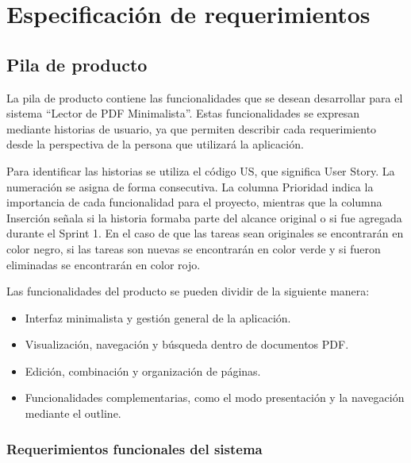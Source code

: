 \chapter{Especificación de requerimientos}
\section{Pila de producto}

La pila de producto contiene las funcionalidades que se desean desarrollar para el sistema “Lector de PDF Minimalista”. Estas funcionalidades se expresan mediante historias de usuario, ya que permiten describir cada requerimiento desde la perspectiva de la persona que utilizará la aplicación.

Para identificar las historias se utiliza el código US, que significa User Story. La numeración se asigna de forma consecutiva. La columna Prioridad indica la importancia de cada funcionalidad para el proyecto, mientras que la columna Inserción señala si la historia formaba parte del alcance original o si fue agregada durante el Sprint 1. En el caso de que las tareas sean originales se encontrarán en color negro, si las tareas son nuevas se encontrarán en color verde y si fueron eliminadas se encontrarán en color rojo.

Las funcionalidades del producto se pueden dividir de la siguiente manera:
\begin{itemize}
    \item Interfaz minimalista y gestión general de la aplicación.
    \item Visualización, navegación y búsqueda dentro de documentos PDF.
    \item Edición, combinación y organización de páginas.
    \item Funcionalidades complementarias, como el modo presentación y la navegación mediante el outline.
    
\end{itemize}

\subsection{Requerimientos funcionales del sistema}

